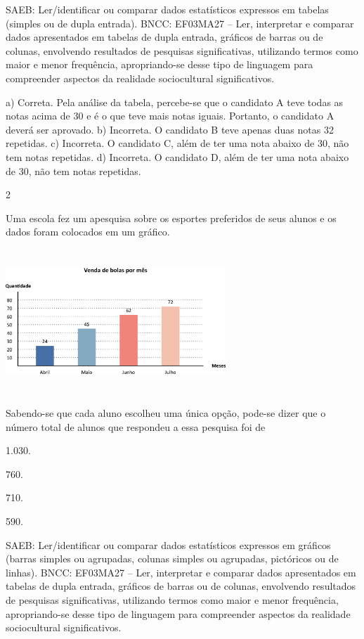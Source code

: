 \begin{escolha}
{\begin{escolha}
{SAEB: Ler/identificar ou comparar dados estatísticos expressos em tabelas (simples ou de dupla entrada). 
BNCC: EF03MA27 -- Ler, interpretar e comparar dados apresentados em tabelas de dupla entrada,
gráficos de barras ou de colunas, envolvendo resultados de pesquisas significativas, utilizando
termos como maior e menor frequência, apropriando-se desse tipo de linguagem para
compreender aspectos da realidade sociocultural significativos.


a) Correta. Pela análise da tabela, percebe-se que o candidato A teve todas as notas
acima de 30 e é o que teve mais notas iguais. Portanto, o candidato A
deverá ser aprovado.
b) Incorreta. O candidato B teve apenas duas notas 32 repetidas.
c) Incorreta. O candidato C, além de ter uma nota abaixo de 30, não tem notas repetidas.
d) Incorreta. O candidato D, além de ter uma nota abaixo de 30, não tem notas repetidas.

\num{2}

Uma escola fez um apesquisa sobre os esportes preferidos de seus alunos
e os dados foram colocados em um gráfico.


\includegraphics[width=3.25862in,height=2.14185in]{media/image105.png}

Sabendo-se que cada aluno escolheu uma única opção, pode-se dizer que o
número total de alunos que respondeu a essa pesquisa foi de

\begin{escolha}
\item
  1.030.
\item
  760.
\item
  710.
\item
  590.
\end{escolha}

SAEB: Ler/identificar ou comparar dados estatísticos expressos em gráficos (barras simples ou agrupadas, colunas simples ou agrupadas, pictóricos ou de linhas). 
BNCC: EF03MA27 -- Ler, interpretar e comparar dados apresentados em tabelas de dupla entrada,
gráficos de barras ou de colunas, envolvendo resultados de pesquisas significativas, utilizando
termos como maior e menor frequência, apropriando-se desse tipo de linguagem para
compreender aspectos da realidade sociocultural significativos.

}
\end{escolha}}
\end{escolha}
